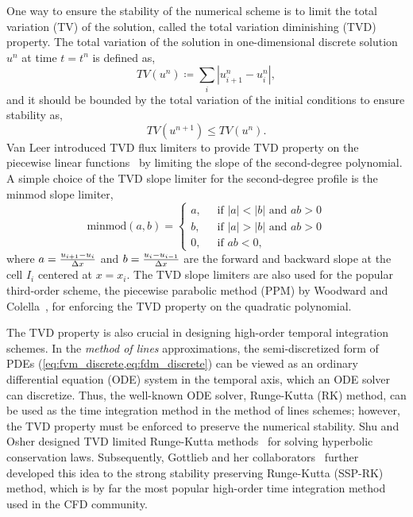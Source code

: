 One way to ensure the stability of the numerical scheme is to limit
the total variation (TV) of the solution,
called the total variation diminishing (TVD) property.
The total variation of the solution in one-dimensional discrete solution
\( u^{n} \) at time \( t = t^{n} \) is defined as,
\begin{equation}\label{eq:tv}
    TV(u^{n}) \coloneqq \sum_{i} \left| u^{n}_{i + 1} - u^{n}_{i} \right|,
\end{equation}
and it should be bounded by the total variation of the initial conditions to ensure stability as,
\begin{equation}\label{eq:tvd}
    TV(u^{n + 1}) \leq TV(u^{n}).
\end{equation}
Van Leer introduced TVD flux limiters to provide TVD property on the piecewise linear functions~\cite{van1979towards}
by limiting the slope of the second-degree polynomial.
A simple choice of the TVD slope limiter for the second-degree profile is the minmod slope limiter,
\begin{equation}\label{eq:minmod}
    \text{minmod}(a,b) =
    \begin{cases}
        a, & \; \text{ if } |a| < |b| \text{ and } ab > 0 \\
        b,& \; \text{ if } |a| > |b| \text{ and } ab > 0 \\
        0,& \; \text{ if } ab < 0,
    \end{cases}
\end{equation}
where \( a = \frac{u_{i + 1} - u_{i}}{\Delta x} \) and \( b = \frac{u_{i} - u_{i - 1}}{\Delta x} \)
are the forward and backward slope at the cell \( I_{i} \) centered at \( x = x_{i} \).
The TVD slope limiters are also used for the popular third-order scheme,
the piecewise parabolic method (PPM) by Woodward and Colella~\cite{colella1984piecewise},
for enforcing the TVD property on the quadratic polynomial.

The TVD property is also crucial in designing high-order temporal integration schemes.
In the \textit{method of lines} approximations, the semi-discretized form of PDEs (\cref{eq:fvm_discrete,eq:fdm_discrete})
can be viewed as an ordinary differential equation (ODE) system in the temporal axis,
which an ODE solver can discretize.
Thus, the well-known ODE solver, Runge-Kutta (RK) method, can be used as the
time integration method in the method of lines schemes; however, the TVD property must be enforced
to preserve the numerical stability.
Shu and Osher designed TVD limited Runge-Kutta methods~\cite{shu1988efficient,shu1988total}
for solving hyperbolic conservation laws.
Subsequently, Gottlieb and her collaborators~\cite{gottlieb1998total,gottlieb2001strong,gottlieb2011strong}
further developed this idea to the strong stability preserving Runge-Kutta (SSP-RK) method,
which is by far the most popular high-order time integration method used in the CFD community.

